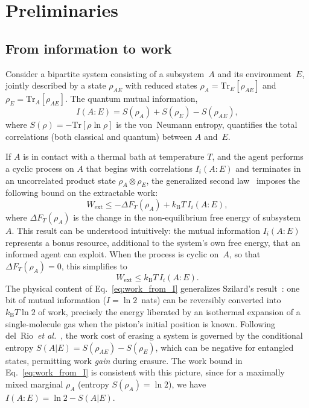 \documentclass[pra,twocolumn,showpacs,preprintnumbers,amsmath,amssymb,longbibliography,
               superscriptaddress]{revtex4-2}
\begin{document}
\section{{Preliminaries}}
\label{sec:prelim}

\subsection{{From information to work}}
\label{sec:info_to_work}

{Consider a bipartite system consisting of a subsystem~$A$ and its
environment~$E$, jointly described by a state $\rho_{AE}$ with reduced
states $\rho_A = \mathrm{Tr}_E[\rho_{AE}]$ and
$\rho_E = \mathrm{Tr}_A[\rho_{AE}]$.
The quantum mutual information,
\begin{equation}
I(A:E) = S(\rho_A) + S(\rho_E) - S(\rho_{AE}),
\label{eq:QMI}
\end{equation}
where $S(\rho) = -\mathrm{Tr}[\rho \ln \rho]$ is the von~Neumann
entropy, quantifies the total correlations (both classical and quantum)
between $A$ and~$E$.}

{If $A$ is in contact with a thermal bath at temperature $T$, and the
agent performs a cyclic process on $A$ that begins with correlations
$I_i(A{:}E)$ and terminates in an uncorrelated product state
$\rho_A\otimes\rho_E$, the generalized second
law~\cite{Bera2017a} imposes the following bound on the extractable
work:
\begin{equation}
W_{\mathrm{ext}} \le -\Delta F_T(\rho_A)
  + k_{\mathrm{B}} T\, I_i(A{:}E),
\label{eq:gen_second_law}
\end{equation}
where $\Delta F_T(\rho_A)$ is the change in the non-equilibrium free
energy of subsystem~$A$.
This result can be understood intuitively: the mutual information
$I_i(A{:}E)$ represents a bonus resource, additional to the
system's own free energy, that an informed agent can exploit.
When the process is cyclic on~$A$, so that $\Delta F_T(\rho_A)=0$,
this simplifies to}
\begin{equation}
W_{\mathrm{ext}} \le k_{\mathrm{B}} T\, I_i(A{:}E).
\label{eq:work_from_I}
\end{equation}
{The physical content of Eq.~\eqref{eq:work_from_I} generalizes
Szilard's result~\cite{Szilard-1929}: one bit of mutual information
($I = \ln 2$~nats) can be reversibly converted into
$k_{\mathrm{B}}T\ln 2$ of work, precisely the energy liberated by an
isothermal expansion of a single-molecule gas when the piston's initial
position is known.
Following del~Rio~\emph{et al.}~\cite{delrio2011thermodynamic}, the
work cost of erasing a system is governed by the conditional entropy
$S(A|E) = S(\rho_{AE}) - S(\rho_E)$, which can be negative for
entangled states, permitting work \emph{gain} during erasure.
The work bound in Eq.~\eqref{eq:work_from_I} is consistent with this
picture, since for a maximally mixed marginal $\rho_A$ (entropy
$S(\rho_A) = \ln 2$), we have $I(A{:}E) = \ln 2 - S(A|E)$.}
\end{document}
